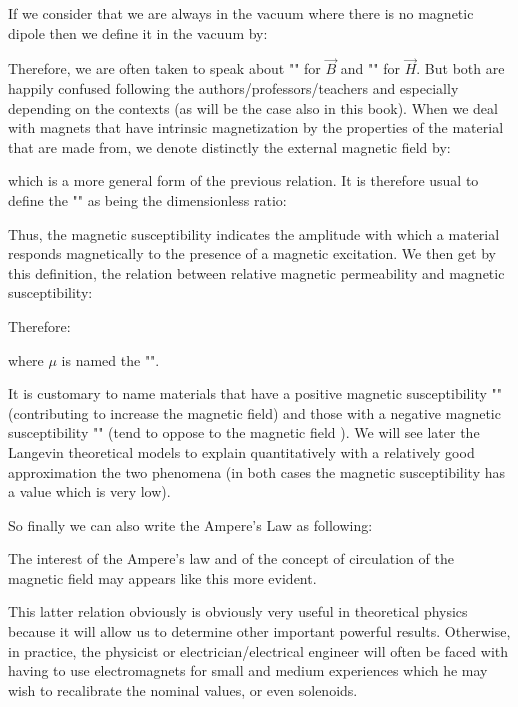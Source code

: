 	If we consider that we are always in the vacuum where there is no magnetic dipole then we define it in the vacuum by:
	
	Therefore, we are often taken to speak about "" for $\vec{B}$ and "" for $\vec{H}$. But both are happily confused following the authors/professors/teachers and especially depending on the contexts (as will be the case also in this book). When we deal with magnets that have intrinsic magnetization by the properties of the material that are made from, we denote distinctly the external magnetic field by:
	
	which is a more general form of the previous relation. It is therefore usual to define the "" as being the dimensionless ratio:
	
	Thus, the magnetic susceptibility indicates the amplitude with which a material responds magnetically to the presence of a magnetic excitation. We then get by this definition, the relation between relative magnetic permeability and magnetic susceptibility:
	
	Therefore:
	
	where $\mu$ is named the "".
	
	It is customary to name materials that have a positive magnetic susceptibility "" (contributing to increase the magnetic field) and those with a negative magnetic susceptibility "" (tend to oppose to the magnetic field ). We will see later the Langevin theoretical models to explain quantitatively with a relatively good approximation the two phenomena (in both cases the magnetic susceptibility has a value which is very low).
	
	So finally we can also write the Ampere's Law as following:
	
	The interest of the Ampere's law and of the concept of circulation of the magnetic field may appears like this more evident.
	
	This latter relation obviously is obviously very useful in theoretical physics because it will allow us to determine other important powerful results. Otherwise, in practice, the physicist or electrician/electrical engineer will often be faced with having to use electromagnets for small and medium experiences which he may wish to recalibrate the nominal values, or even solenoids.
	
